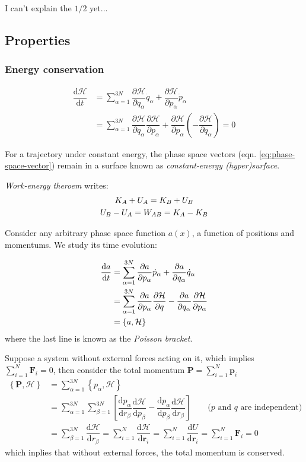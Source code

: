 \documentclass[
  10pt,
  twoside,
  openany,
  b5paper, %
  colorscheme = bootstrap-v4, %
]{qyxf-book}
\numberwithin{equation}{section}
\newcommand{\md}{\mathrm{d}}
\newcommand{\der}[2]{\dfrac{\md #1}{\md #2}}
\newcommand{\p}[2]{\dfrac{\partial #1}{\partial #2}}
\newcommand{\vF}{\boldsymbol{F}}
\newcommand{\vr}{\boldsymbol{r}}
\newcommand{\vp}{\boldsymbol{p}}
\newcommand{\sumin}{\sum_{i=1}^N}
\newcommand{\suman}{\sum_{\alpha=1}^{3N}}
\newcommand{\ham}{\mathcal{H}} %
\begin{document}
\supplement I can't explain the $1/2$ yet...

\subsection{Properties}

\vspace{0.5em}
\subsubsection{Energy conservation}
\vspace{-1.2em}
\begin{align*}
	\der{\ham}{t}&=\suman \p{\ham}{q_\alpha}\dot{q}_\alpha+\p{\ham}{p_\alpha}\dot{p}_\alpha\\
	&=\suman\p{\ham}{q_\alpha}\p{\ham}{p_\alpha}+\p{\ham}{p_\alpha}(-\p{\ham}{q_\alpha})=0
\end{align*}

For a trajectory under constant energy, the phase space vectors (eqn. \ref{eq:phase-space-vector}) remain in a surface known as \textit{constant-energy (hyper)surface}.

\textit{Work-energy theroem} writes:
\begin{gather}
	K_A+U_A=K_B+U_B \notag\\
	U_B-U_A=W_{AB}=K_A-K_B
\end{gather}

Consider any arbitrary phase space function $a(x)$, a function of positions and momentums. We study its time evolution:
\begin{tcolorbox}
	\begin{align}
		\der{a}{t}&=\suman\p{a}{p_\alpha}\dot{p}_\alpha+\p{a}{q_\alpha}\dot{q}_\alpha \notag\\
		&=\suman\p{a}{p_\alpha}\p{\ham}{q}-\p{a}{q_\alpha}\p{\ham}{p_\alpha}\\
		&=\left\{a,\ham\right\} \label{eq:poisson-bracket}
	\end{align}
	where the last line is known as the \textit{Poisson bracket}.
\end{tcolorbox}

\example Suppose a system without external forces acting on it, which implies $\sumin \vF_i=0$, then consider the total momentum $\boldsymbol{P}=\sumin\vp_i$
\begin{align*}
	\left\{\boldsymbol{P},\ham\right\}&=\suman\left\{p_\alpha,\ham\right\}\\
	&=\suman\sum_{\beta=1}^{3N}\left[\der{p_\alpha}{r_\beta}\der{\ham}{p_\beta}-\der{p_\alpha}{p_\beta}\der{\ham}{r_\beta}\right] \qquad\text{($p$ and $q$ are independent)}\\
	&=\sum_{\beta=1}^{3N}\der{\ham}{r_\beta}=\sumin\der{\ham}{\vr_i}=\sumin\der{U}{\vr_i}=\sumin\vF_i=0
\end{align*}
which inplies that without external forces, the total momentum is conserved.
\end{document}
